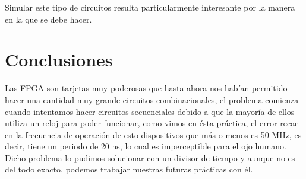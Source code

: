 \documentclass{mylib/reporteConCalif}
\begin{document}
Simular este tipo de circuitos resulta particularmente interesante por la manera en la que se debe hacer.


\section{Conclusiones}

Las FPGA son tarjetas muy poderosas que hasta ahora nos habían permitido hacer una cantidad muy grande circuitos combinacionales, el problema comienza cuando intentamos hacer circuitos secuenciales debido a que la mayoría de ellos utiliza un reloj para poder funcionar, como vimos en ésta práctica, el error recae en la frecuencia de operación de esto dispositivos que más o menos es 50 MHz, es decir, tiene un periodo de 20 ns, lo cual es imperceptible para el ojo humano. Dicho problema lo pudimos solucionar con un divisor de tiempo y aunque no es del todo exacto, podemos trabajar nuestras futuras prácticas con él.
\end{document}
